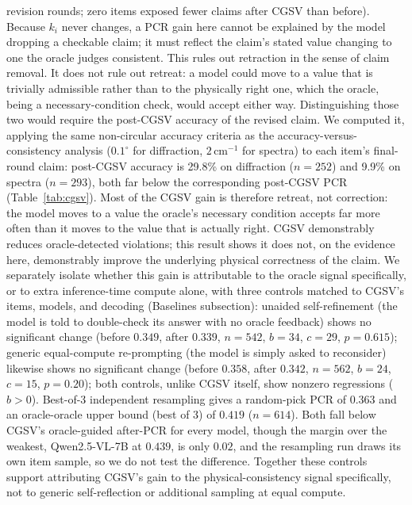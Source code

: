 \documentclass[pdflatex,sn-nature]{sn-jnl}
\begin{document}
revision rounds; zero items exposed fewer claims after CGSV than before). Because $k_i$
never changes, a PCR gain here cannot be explained by the model dropping a checkable claim;
it must reflect the claim's stated value changing to one the oracle judges consistent. This
rules out retraction in the sense of claim removal. It does not rule out retreat: a model
could move to a value that is trivially admissible rather than to the physically right one,
which the oracle, being a necessary-condition check, would accept either way. Distinguishing
those two would require the post-CGSV accuracy of the revised claim. We computed it, applying
the same non-circular accuracy criteria as the accuracy-versus-consistency analysis
($0.1^\circ$ for diffraction, $2\,\mathrm{cm}^{-1}$ for spectra) to each item's final-round
claim: post-CGSV accuracy is 29.8\% on diffraction ($n=252$) and 9.9\% on spectra ($n=293$),
both far below the corresponding post-CGSV PCR (Table~\ref{tab:cgsv}). Most of the CGSV gain
is therefore retreat, not correction: the model moves to a value the oracle's necessary
condition accepts far more often than it moves to the value that is actually right. CGSV
demonstrably reduces oracle-detected violations; this result shows it does not, on the
evidence here, demonstrably improve the underlying physical correctness of the claim. We separately isolate whether this gain is
attributable to the oracle signal specifically, or to extra inference-time compute alone,
with three controls matched to CGSV's items, models, and decoding
(Baselines subsection): unaided self-refinement (the model is told to double-check its
answer with no oracle feedback) shows no significant change (before $0.349$, after $0.339$, $n=542$, $b=34$, $c=29$, $p=0.615$);
generic equal-compute re-prompting (the model is simply asked to reconsider) likewise shows
no significant change (before $0.358$, after $0.342$, $n=562$, $b=24$, $c=15$, $p=0.20$); both controls, unlike CGSV
itself, show nonzero regressions ($b>0$). Best-of-3 independent resampling gives a
random-pick PCR of $0.363$ and an oracle-oracle upper bound (best of 3) of $0.419$
($n=614$). Both fall below CGSV's oracle-guided after-PCR for every model, though the
margin over the weakest, Qwen2.5-VL-7B at $0.439$, is only $0.02$, and the resampling run
draws its own item sample, so we do not test the difference. Together these
controls support attributing CGSV's gain to the physical-consistency signal specifically,
not to generic self-reflection or additional sampling at equal compute.
\end{document}
